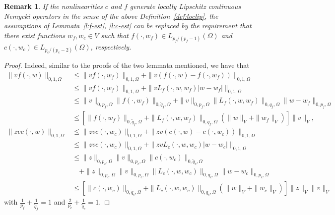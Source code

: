\documentclass[12pt,DIV=14]{scrartcl}
\newtheorem{remark}[definition]{Remark}
\providecommand{\Om}{\Omega}
\begin{document}
\begin{remark}\label{rem:df-est}
If the nonlinearities $c$ and $f$ generate locally Lipschitz continuous
Nemycki operators in the sense of the above Definition~\ref{def:loclip}, the
assumptions of Lemmata~\ref{l:f-est}, \ref{l:c-est} can be replaced by
the requirement that there exist functions $w_f,w_c\in V$ such that
$f(\cdot,w_f)\in L_{p_f/(p_f-1)}(\Om)$ and $c(\cdot,w_c)\in L_{p_c/(p_c-2)}(\Om)$,
respectively.
\end{remark}
\begin{proof}
Indeed, similar to the proofs of the two lemmata mentioned, we have that
\begin{align*}
\|vf(\cdot,w)\|_{0,1,\Om}
&\le \|vf(\cdot,w_f)\|_{0,1,\Om} + \|v(f(\cdot,w) - f(\cdot,w_f))\|_{0,1,\Om}\\
&\le \|vf(\cdot,w_f)\|_{0,1,\Om} + \|vL_f(\cdot,w,w_f) |w-w_f|\|_{0,1,\Om}\\
&\le \|v\|_{0,p_f,\Om}\|f(\cdot,w_f)\|_{0,\tilde{q}_f,\Om}
+ \|v\|_{0,p_f,\Om}\|L_f(\cdot,w,w_f)\|_{0,q_f,\Om}\|w-w_f\|_{0,p_f,\Om}\\
&\le \left[\|f(\cdot,w_f)\|_{0,\tilde{q}_f,\Om}
+ \|L_f(\cdot,w,w_f)\|_{0,q_f,\Om}(\|w\|_V + \|w_f\|_V)\right]\|v\|_V,\\
\|zvc(\cdot,w)\|_{0,1,\Om}
&\le \|zvc(\cdot,w_c)\|_{0,1,\Om} + \|zv(c(\cdot,w) - c(\cdot,w_c))\|_{0,1,\Om}\\
&\le \|zvc(\cdot,w_c)\|_{0,1,\Om} + \|zvL_c(\cdot,w,w_c) |w-w_c|\|_{0,1,\Om}\\
&\le \|z\|_{0,p_c,\Om}\|v\|_{0,p_c,\Om}\|c(\cdot,w_c)\|_{0,\tilde{q}_c,\Om}\\
&\quad + \|z\|_{0,p_c,\Om}\|v\|_{0,p_c,\Om}\|L_c(\cdot,w,w_c)\|_{0,q_c,\Om}\|w-w_c\|_{0,p_c,\Om}\\
&\le \left[\|c(\cdot,w_c)\|_{0,\tilde{q}_c,\Om}
+ \|L_c(\cdot,w,w_c)\|_{0,q_c,\Om}(\|w\|_V + \|w_c\|_V)\right]\|z\|_V\|v\|_V
\end{align*}
with
$\frac{1}{p_f}+\frac{1}{\tilde{q}_f}=1$
and
$\frac{2}{p_c}+\frac{1}{\tilde{q}_c}=1$.
\end{proof}
\end{document}
